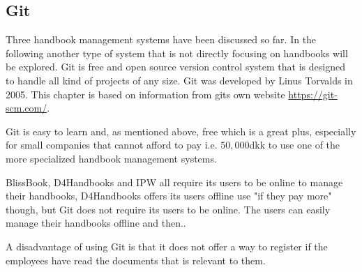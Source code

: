 \subsection{Git}
Three handbook management systems have been discussed so far.
In the following another type of system that is not directly focusing on handbooks will be explored.
Git is free and open source version control system that is designed to handle all kind of projects of any size.
Git was developed by Linus Torvalds in 2005.
This chapter is based on information from gits own website \url{https://git-scm.com/}.

Git is easy to learn and, as mentioned above, free which is a great plus, especially for small companies that cannot afford to pay i.e. $50,000$dkk to use one of the more specialized handbook management systems.

BlissBook, D4Handbooks and IPW all require its users to be online to manage their handbooks, D4Handbooks offers its users offline use "if they pay more" though, but Git does not require its users to be online.
The users can easily manage their handbooks offline and then.. %

A disadvantage of using Git is that it does not offer a way to register if the employees have read the documents that is relevant to them.


